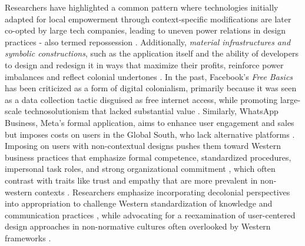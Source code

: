 Researchers have highlighted a common pattern where technologies initially adapted for local empowerment through context-specific modifications are later co-opted by large tech companies, leading to uneven power relations in design practices \cite{10.1145/3630106.3658934, 10.1145/3637316, 10.1145/1753326.1753522}- also termed repossession \cite{doi:10.1177/1461444816629474}. Additionally, \textit{material infrastructures and symbolic constructions}, such as the application itself and the ability of developers to design and redesign it in ways that maximize their profits, reinforce power imbalances and reflect colonial undertones \cite{doi:10.1177/1527476419831640}. In the past, Facebook's \textit{Free Basics} has been criticized as a form of digital colonialism, primarily because it was seen as a data collection tactic disguised as free internet access, while promoting large-scale technosolutionism that lacked substantial value \cite{Thorat2020}. Similarly, WhatsApp Business, Meta’s formal application, aims to enhance user engagement and sales but imposes costs on users in the Global South, who lack alternative platforms \cite{whatsapp_business, 10.1145/3613905.3651034}. Imposing on users with non-contextual designs pushes them toward Western business practices that emphasize formal competence, standardized procedures, impersonal task roles, and strong organizational commitment \cite{berger2020doing, Sinha1990}, which often contrast with traits like trust and empathy that are more prevalent in non-western contexts \cite{berger2020doing}. Researchers emphasize incorporating decolonial perspectives into appropriation to challenge Western standardization of knowledge and communication practices \cite{10.1145/3328020.3353927, wagner2020decolonizing}, while advocating for a reexamination of user-centered design approaches in non-normative cultures often overlooked by Western frameworks \cite{doi:10.1177/0162243910389594, 10.1145/2662155.2662195}.



